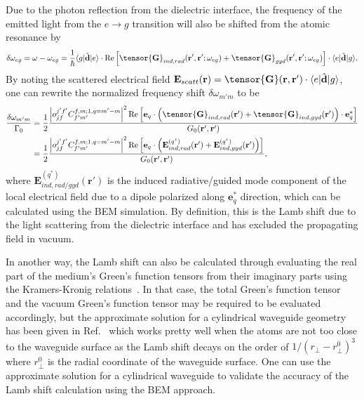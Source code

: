 \documentclass[preprint,aps,pra,onecolumn,superscriptaddress]{revtex4-1} %
\def\br{\mathbf{r}}
\def\bra#1{\langle{#1}\rvert}%
\def\ket#1{\lvert{#1}\rangle}%
\begin{document}
\begin{appendix}
Due to the photon reflection from the dielectric interface, the frequency of the emitted light from the $ e\rightarrow g $ transition will also be shifted from the atomic resonance by 
\begin{align}
\delta\omega_{eg}=\omega-\omega_{eg}= \frac{1}{\hbar} \bra{g}\hat{\mathbf{d}}\ket{e}\cdot \mathrm{Re}\left[ \tensor{\mathbf{G}}_{ind,rad}(\br',\br';\omega_{eg})+\tensor{\mathbf{G}}_{gyd}(\br',\br';\omega_{eg})\right]\cdot \bra{e}\hat{\mathbf{d}}\ket{g}.
\end{align}
By noting the scattered electrical field $ \mathbf{E}_{scatt}(\br)=\tensor{\mathbf{G}}(\br,\br')\cdot \bra{e}\hat{\mathbf{d}}\ket{g} $, one can rewrite the normalized frequency shift $ \delta\omega_{m'm} $ to be
\begin{align}
\frac{\delta\omega_{m'm}}{\Gamma_0} &= \frac{1}{2} \frac{\left|o_{jf}^{j'f'}C_{f'm'}^{f,m;1,q=m'-m}\right|^2 \mathrm{Re}\left[ \mathbf{e}_q\cdot\left(\tensor{\mathbf{G}}_{ind,rad}(\br')+\tensor{\mathbf{G}}_{ind,gyd}(\br')\right)\cdot\mathbf{e}_q^*\right]}{G_0(\br',\br')}\\
&=\frac{1}{2} \frac{\left|o_{jf}^{j'f'}C_{f'm'}^{f,m;1,q=m'-m}\right|^2 \mathrm{Re}\left[ \mathbf{e}_q\cdot\left(\mathbf{E}_{ind,rad}^{(q^*)}(\br')+\mathbf{E}_{ind,gyd}^{(q^*)}(\br')\right)\right]}{G_0(\br',\br')},
\end{align}
where $ \mathbf{E}_{ind,rad/gyd}^{(q^*)}(\br') $ is the induced radiative/guided mode component of the local electrical field due to a dipole polarized along $ \mathbf{e}_q^* $ direction, which can be calculated using the BEM simulation. 
By definition, this is the Lamb shift due to the light scattering from the dielectric interface and has excluded the propagating field in vacuum. 

In another way, the Lamb shift can also be calculated through evaluating the real part of the medium's Green's function tensors from their imaginary parts using the Kramers-Kronig relations~\cite{Dzsotjan2011}. In that case, the total Green's function tensor and the vacuum Green's function tensor may be required to be evaluated accordingly, but the approximate solution for a cylindrical waveguide geometry has been given in Ref.~\cite{Dzsotjan2011} which works pretty well when the atoms are not too close to the waveguide surface as the Lamb shift decays on the order of $ 1/(r_\perp-r_\perp^0)^3 $ where $ r_\perp^0 $ is the radial coordinate of the waveguide surface. One can use the approximate solution for a cylindrical waveguide to validate the accuracy of the Lamb shift calculation using the BEM approach. 


\end{appendix}
\end{document}
